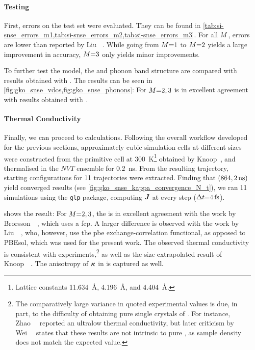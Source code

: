 \paragraph{Testing}
First, errors on the test set were evaluated. They can be found in \cref{tab:si-snse_errors_m1,tab:si-snse_errors_m2,tab:si-snse_errors_m3}. For all $M$, errors are lower than reported by Liu \etal~\cite{lqzg2021q}. While going from $M{=}1$ to $M{=}2$ yields a large improvement in accuracy, $M{=}3$ only yields minor improvements.

To further test the model, the \vdos and phonon band structure are compared with results obtained with \aims.
The results can be seen in \cref{fig:gko_snse_vdos,fig:gko_snse_phonons}: For $M{=}2,3$ \sok is in excellent agreement with results obtained with \dft.


\paragraph{Thermal Conductivity}
Finally, we can proceed to \gk calculations.
Following the overall workflow developed for the previous sections, approximately cubic simulation cells at different sizes were constructed from the primitive cell at \qty{300}{K}\footnote{Lattice constants \qty{11.634}{\angstrom}, \qty{4.196}{\angstrom}, and \qty{4.404}{\angstrom}.} obtained by Knoop~\etal,  and thermalised in the $NVT$ ensemble for \qty{0.2}{ns}. From the resulting trajectory, starting configurations for \num{11} trajectories were extracted.
Finding that $(864, \qty{2}{ns})$ yield converged results (see \cref{fig:gko_snse_kappa_convergence_N_t}), we ran \num{11} \md simulations using the \texttt{glp} package, computing $\boldsymbol{J}$ at every step ($\Delta t{=}\qty{4}{fs}$).

 shows the result:  For $M{=}2,3$, the \glp is in excellent agreement with the work by Brorsson~\etal~\cite{bhke2021t}, which uses a \gls{fcp}.
A larger difference is observed with the work by Liu~\etal~\cite{lqzg2021q}, who, however, use the \gls{pbe} exchange-correlation functional, as opposed to PBEsol, which was used for the present work.
The observed thermal conductivity is consistent with experiments,\footnote[][-6\baselineskip]{The comparatively large variance in quoted experimental values is due, in part, to the difficulty of obtaining pure single crystals of . For instance, Zhao~\etal~\cite{zldk2014t} reported an ultralow thermal conductivity, but later criticism by Wei~\etal~\cite{wbcr2016t} states that these results are not intrinsic to pure , as sample density does not match the expected value.} as well as the size-extrapolated \dft result of Knoop~\etal~\cite{kpsc2023t}.
The anisotropy of $\boldsymbol{\kappa}$ in  is captured as well.

